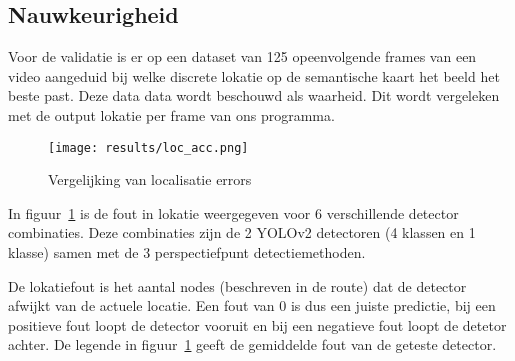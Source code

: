 \subsection{Nauwkeurigheid}
Voor de validatie is er op een dataset van 125 opeenvolgende frames van een video aangeduid bij welke discrete lokatie op de semantische kaart
het beeld het beste past.
Deze data data wordt beschouwd als waarheid.
Dit wordt vergeleken met de output lokatie per frame van ons programma.

\begin{figure}[h]
    \texttt{[image: results/loc\_acc.png]}
    \caption{Vergelijking van localisatie errors}
    \label{fig:loc_acc}
\end{figure}

In figuur~\ref{fig:loc_acc} is de fout in lokatie weergegeven voor 6 verschillende detector combinaties.
Deze combinaties zijn de 2 YOLOv2 detectoren (4 klassen en 1 klasse) samen met de 3 perspectiefpunt detectiemethoden.

De lokatiefout is het aantal nodes (beschreven in de route) dat de detector afwijkt van de actuele locatie.
Een fout van 0 is dus een juiste predictie, bij een positieve fout loopt de detector vooruit en bij een negatieve fout loopt de detetor achter.
De legende in figuur~\ref{fig:loc_acc} geeft de gemiddelde fout van de geteste detector.